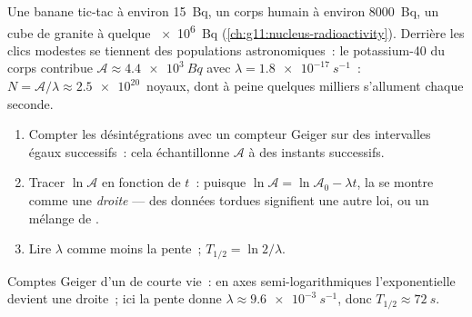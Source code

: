 \begin{example}\label{ex:g12:radioactive-decay:body}
Une banane tic-tac à environ \qty{15}{Bq}, un corps humain à environ
\qty{8000}{Bq}, un  cube de granite à quelque
\qty{e6}{Bq} (\cref{ch:g11:nucleus-radioactivity}). Derrière les clics
modestes se tiennent des populations astronomiques~: le potassium-40
du corps contribue $\mathcal A \approx \qty{4.4e3}{Bq}$ avec
$\lambda = \qty{1.8e-17}{s^{-1}}$~: $N = \mathcal A/\lambda \approx
\num{2.5e20}$~noyaux, dont à peine quelques milliers s'allument chaque
seconde.
\end{example}

\begin{method}\label{met:g12:radioactive-decay:semilog}
\begin{enumerate}
  \item Compter les désintégrations avec un compteur Geiger sur des
        intervalles égaux successifs~: cela échantillonne
        $\mathcal A$ à des instants successifs.
  \item Tracer $\ln \mathcal A$ en fonction de $t$~: puisque
        $\ln \mathcal A = \ln \mathcal A_0 - \lambda t$, la
         se montre
        comme une \emph{droite} --- des données tordues signifient
        une autre loi, ou un mélange de
        .
  \item Lire $\lambda$ comme moins la pente~;
        $T_{1/2} = \ln 2/\lambda$.
\end{enumerate}
\end{method}

\begin{omfigure}

{\small Comptes Geiger d'un  de courte
vie~: en axes semi-logarithmiques l'exponentielle devient une droite~;
ici la pente donne $\lambda \approx \qty{9.6e-3}{s^{-1}}$, donc
$T_{1/2} \approx \qty{72}{s}$.}
\end{omfigure}

